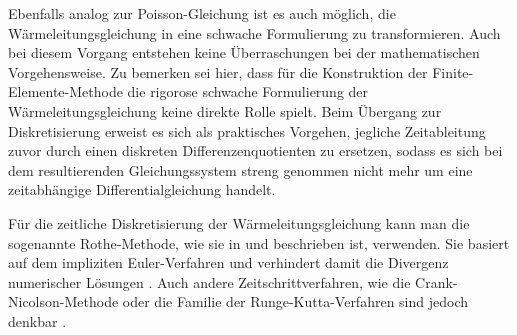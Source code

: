   Ebenfalls analog zur Poisson-Gleichung ist es auch möglich, die Wärmeleitungsgleichung in eine schwache Formulierung zu transformieren.
  Auch bei diesem Vorgang entstehen keine Überraschungen bei der mathematischen Vorgehensweise.
  Zu bemerken sei hier, dass für die Konstruktion der Finite-Elemente-Methode die rigorose schwache Formulierung der Wärmeleitungsgleichung keine direkte Rolle spielt.
  Beim Übergang zur Diskretisierung erweist es sich als praktisches Vorgehen, jegliche Zeitableitung zuvor durch einen diskreten Differenzenquotienten zu ersetzen, sodass es sich bei dem resultierenden Gleichungssystem streng genommen nicht mehr um eine zeitabhängige Differentialgleichung handelt.
  \cite{Schweizer2013,Alberty1998}

  Für die zeitliche Diskretisierung der Wärmeleitungsgleichung kann man die sogenannte Rothe-Methode, wie sie in \cite[S.~211~ff]{Schweizer2013} und \cite{Alberty1998} beschrieben ist, verwenden.
  Sie basiert auf dem impliziten Euler-Verfahren und verhindert damit die Divergenz numerischer Lösungen \cite[S.~472~f]{Quarteroni2000}.
  Auch andere Zeitschrittverfahren, wie die Crank-Nicolson-Methode oder die Familie der Runge-Kutta-Verfahren sind jedoch denkbar \cite{Quarteroni2000,Cheney2008}.

